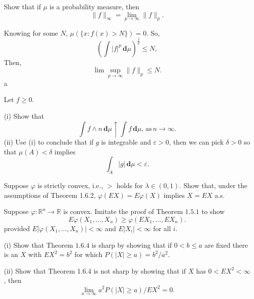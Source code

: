 \documentclass[en, normal, 11pt, black]{elegantnote}
\newenvironment{exercise}[1]{\begin{tcolorbox}[colback=black!15, colframe=black!80, breakable, title=#1]}{\end{tcolorbox}}
\renewenvironment{proof}{\begin{tcolorbox}[colback=white, colframe=black!50, breakable, title=Proof. ]\setlength{\parskip}{0.8em}}{\\\rightline{$\square$}\end{tcolorbox}}
\newcommand{\der}{\,\mathbf{d}}
\begin{document}
    \begin{exercise}{1.5.2}
        Show that if $\mu$ is a probability measure, then
        \[
            \|f\|_{\infty}=\lim_{p\to\infty}\|f\|_p. 
        \]
    \end{exercise}
    \begin{proof}
        Knowing for some $N$, $\mu(\{x:f(x)>N\})=0$. So, 
        \[
            \left(\int |f|^p\der\mu\right)^{\frac{1}{p}}\leqslant N, 
        \]
        Then, 
        \[
            \lim\sup_{p\to\infty}\|f\|_p\leqslant N. 
        \]
        a
    \end{proof}


    \begin{exercise}{1.5.7}
        Let $f\geqslant0$. 
        
        (i) Show that
        \[
            \int f\wedge n\der\mu\uparrow\int f\der\mu,\,\text{as}\,n\to\infty. 
        \]
        (ii) Use (i) to conclude that if $g$ is integrable and $\varepsilon>0$, then we can pick $\delta > 0$ so that $\mu(A) < \delta$ implies
        \[
            \int_A|g|\der\mu<\varepsilon. 
        \]
    \end{exercise}

    \begin{exercise}{1.6.1}
        Suppose $\varphi$ is strictly convex, i.e., $>$ holds for $\lambda \in(0,1)$. Show that, under the assumptions of Theorem 1.6.2, $\varphi(E X)=E \varphi(X)$ implies $X=E X$ a.s. 
    \end{exercise}



    \begin{exercise}{1.6.2}
        Suppose $\varphi: \mathbb{R}^{n} \rightarrow \mathbb{R}$ is convex. Imitate the proof of Theorem $1.5.1$ to show
        \[
            E \varphi\left(X_{1}, \ldots, X_{n}\right) \geq \varphi\left(E X_{1}, \ldots, E X_{n}\right). 
        \]
        provided $E\left|\varphi\left(X_{1}, \ldots, X_{n}\right)\right|<\infty$ and $E\left|X_{i}\right|<\infty$ for all $i$. 
    \end{exercise}



    \begin{exercise}{1.6.3. Chebyshev's inequality is and is not sharp.}        
        (i) Show that Theorem $1.6.4$ is sharp by showing that if $0<b \leq a$ are fixed there is an $X$ with $E X^{2}=b^{2}$ for which $P(|X| \geq a)=b^{2} / a^{2}$. 
        
        (ii) Show that Theorem 1.6.4 is not sharp by showing that if $X$ has $0<E X^{2}<\infty$, then
        \[
            \lim _{a \rightarrow \infty} a^{2} P(|X| \geq a) / E X^{2}=0. 
        \]
    \end{exercise}
\end{document}
